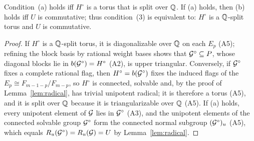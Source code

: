 \begin{lemma}\label{lem:acrit}
Condition~(a) holds iff $H^\circ$ is a torus that is split over $\mathbb{Q}$. If (a) holds, then (b)
holds iff $U$ is commutative; thus condition~(3) is equivalent to: $H^\circ$ is a $\mathbb{Q}$-split torus
and $U$ is commutative.
\end{lemma}
\begin{proof}
If $H^\circ$ is a $\mathbb{Q}$-split torus, it is diagonalizable over $\mathbb{Q}$ on each $E_p$ (A5); refining the
block basis by rational weight bases shows that $\mathcal{G}^\circ\subseteq P$, whose diagonal blocks lie in
$b(\mathcal{G}^\circ)=H^\circ$ (A2), is upper triangular. Conversely, if $\mathcal{G}^\circ$ fixes a complete rational
flag, then $H^\circ=b(\mathcal{G}^\circ)$ fixes the induced flags of the $E_p\cong F_{m-1-p}/F_{m-p}$, so
$H^\circ$ is connected, solvable and, by the proof of Lemma~\ref{lem:radical}, has trivial unipotent
radical; it is therefore a torus (A5), and it is split over $\mathbb{Q}$ because it is triangularizable over
$\mathbb{Q}$ (A5). If (a) holds, every unipotent element of $\mathcal{G}$ lies in $\mathcal{G}^\circ$ (A3), and the unipotent
elements of the connected solvable group $\mathcal{G}^\circ$ form the connected normal subgroup
$(\mathcal{G}^\circ)_u$ (A5), which equals $R_u(\mathcal{G}^\circ)=R_u(\mathcal{G})=U$ by Lemma~\ref{lem:radical}.
\end{proof}

